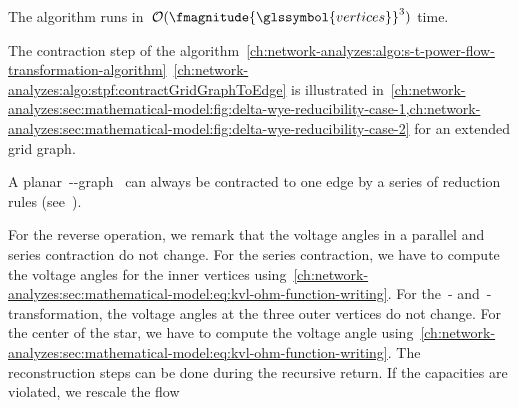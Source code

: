 \begin{lemma}
    The algorithm runs in~$\bigO(\fmagnitude{\glssymbol{vertices}}^3)$ time. 
    \label{ch:network-analyzes:sec:mathematical-model:obs:arbitrary-capacities}
\end{lemma}
% 
The contraction step of the
algorithm~\cref{ch:network-analyzes:algo:s-t-power-flow-transformation-algorithm}~\cref{ch:network-analyzes:algo:stpf:contractGridGraphToEdge}
is illustrated
in~\cref{ch:network-analyzes:sec:mathematical-model:fig:delta-wye-reducibility-case-1,ch:network-analyzes:sec:mathematical-model:fig:delta-wye-reducibility-case-2}
for an extended grid graph.
% 
\begin{lemma}
    A planar~\source-\sink-graph~ can always be contracted to one
    edge by a series of reduction rules (see~\parencite{Tru89}).
    \label{ch:network-analyzes:sec:mathematical-model:con:planar-graph-single-edge}
\end{lemma}
% 
For the reverse operation, we remark that the voltage angles in a parallel and
series contraction do not change. For the series contraction, we have to compute
the voltage angles for the inner vertices
using~\cref{ch:network-analyzes:sec:mathematical-model:eq:kvl-ohm-function-writing}.
For the~\deltawye- and~\wyedelta-transformation, the voltage angles at the three
outer vertices do not change. For the center of the star, we have to compute the
voltage angle
using~\cref{ch:network-analyzes:sec:mathematical-model:eq:kvl-ohm-function-writing}.
The reconstruction steps can be done during the recursive return. If the
capacities are violated, we rescale the flow~
